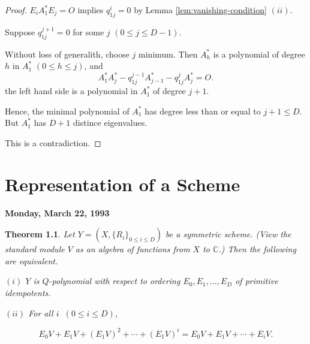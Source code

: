 \documentclass[
]{book}
\newtheorem{theorem}{Theorem}[chapter]
\theoremstyle{definition}
\theoremstyle{definition}
\theoremstyle{definition}
\theoremstyle{definition}
\theoremstyle{remark}
\begin{document}
\begin{proof}
\(E_iA^*_1E_j = O\) implies \(q^i_{1j} = 0\) by Lemma \ref{lem:vanishing-condition} \((ii)\).

Suppose \(q^{j+1}_{1j} = 0\) for some \(j\) \((0\leq j\leq D-1)\).

Without loss of generalith, choose \(j\) minimum. Then
\(A^*_h\) is a polynomial of degree \(h\) in \(A^*_1\) \((0\leq h\leq j)\), and
\[A^*_1A^*_j - q^{j-1}_{1j}A^*_{j-1} - q^j_{1j}A^*_j = O.\]
the left hand side is a polynomial in \(A^*_1\) of degree \(j+1\).

Hence, the minimal polynomial of \(A^*_1\) has degree less than or equal to \(j+1 \leq D\). But \(A^*_1\) has \(D+1\) distince eigenvalues.

This is a contradiction.

\end{proof}

\hypertarget{lec23}{%
\chapter{Representation of a Scheme}\label{lec23}}

\textbf{Monday, March 22, 1993}

\begin{theorem}
\protect\hypertarget{thm:q-polynomial-space}{}\label{thm:q-polynomial-space}Let \(Y = (X, \{R_i\}_{0\leq i\leq D})\) be a symmetric scheme. (View the standard module \(V\) as an algebra of functions from \(X\) to \(\mathbb{C}\).) Then the following are equivalent.

\((i)\) \(Y\) is \(Q\)-polynomial with respect to ordering \(E_0, E_1, \ldots, E_D\) of primitive idempotents.

\((ii)\) For all \(i\) \(\:(0\leq i\leq D)\),

\[E_0V + E_1V + (E_1V)^2 + \cdots + (E_1V)^i = E_0V + E_1V + \cdots + E_iV.\]
\end{theorem}
\end{document}
